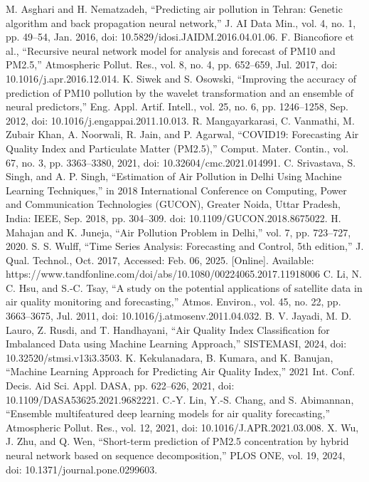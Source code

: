 \documentclass[conference]{IEEEtran}
\begin{document}
\begin{thebibliography}{00}
 M. Asghari and H. Nematzadeh, “Predicting air pollution in Tehran: Genetic algorithm and back propagation neural network,” J. AI Data Min., vol. 4, no. 1, pp. 49–54, Jan. 2016, doi: 10.5829/idosi.JAIDM.2016.04.01.06.
 F. Biancofiore et al., “Recursive neural network model for analysis and forecast of PM10 and PM2.5,” Atmospheric Pollut. Res., vol. 8, no. 4, pp. 652–659, Jul. 2017, doi: 10.1016/j.apr.2016.12.014.
 K. Siwek and S. Osowski, “Improving the accuracy of prediction of PM10 pollution by the wavelet transformation and an ensemble of neural predictors,” Eng. Appl. Artif. Intell., vol. 25, no. 6, pp. 1246–1258, Sep. 2012, doi: 10.1016/j.engappai.2011.10.013.
 R. Mangayarkarasi, C. Vanmathi, M. Zubair Khan, A. Noorwali, R. Jain, and P. Agarwal, “COVID19: Forecasting Air Quality Index and Particulate Matter (PM2.5),” Comput. Mater. Contin., vol. 67, no. 3, pp. 3363–3380, 2021, doi: 10.32604/cmc.2021.014991.
 C. Srivastava, S. Singh, and A. P. Singh, “Estimation of Air Pollution in Delhi Using Machine Learning Techniques,” in 2018 International Conference on Computing, Power and Communication Technologies (GUCON), Greater Noida, Uttar Pradesh, India: IEEE, Sep. 2018, pp. 304–309. doi: 10.1109/GUCON.2018.8675022.
 H. Mahajan and K. Juneja, “Air Pollution Problem in Delhi,” vol. 7, pp. 723–727, 2020.
 S. S. Wulff, “Time Series Analysis: Forecasting and Control, 5th edition,” J. Qual. Technol., Oct. 2017, Accessed: Feb. 06, 2025. [Online]. Available: https://www.tandfonline.com/doi/abs/10.1080/00224065.2017.11918006
 C. Li, N. C. Hsu, and S.-C. Tsay, “A study on the potential applications of satellite data in air quality monitoring and forecasting,” Atmos. Environ., vol. 45, no. 22, pp. 3663–3675, Jul. 2011, doi: 10.1016/j.atmosenv.2011.04.032.
 B. V. Jayadi, M. D. Lauro, Z. Rusdi, and T. Handhayani, “Air Quality Index Classification for Imbalanced Data using Machine Learning Approach,” SISTEMASI, 2024, doi: 10.32520/stmsi.v13i3.3503.
 K. Kekulanadara, B. Kumara, and K. Banujan, “Machine Learning Approach for Predicting Air Quality Index,” 2021 Int. Conf. Decis. Aid Sci. Appl. DASA, pp. 622–626, 2021, doi: 10.1109/DASA53625.2021.9682221.
 C.-Y. Lin, Y.-S. Chang, and S. Abimannan, “Ensemble multifeatured deep learning models for air quality forecasting,” Atmospheric Pollut. Res., vol. 12, 2021, doi: 10.1016/J.APR.2021.03.008.
 X. Wu, J. Zhu, and Q. Wen, “Short-term prediction of PM2.5 concentration by hybrid neural network based on sequence decomposition,” PLOS ONE, vol. 19, 2024, doi: 10.1371/journal.pone.0299603.

\end{thebibliography}
\end{document}
